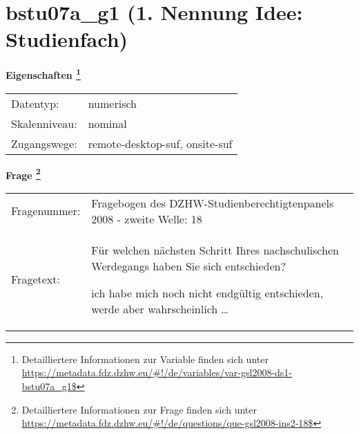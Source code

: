 
    \setcounter{footnote}{0}

    \vspace*{-1.8cm}
	\section{bstu07a\_g1 (1. Nennung Idee: Studienfach)}
	\label{section:bstu07a_g1}



    \vspace*{0.5cm}
    \noindent\textbf{Eigenschaften
	\footnote{Detailliertere Informationen zur Variable finden sich unter
		\url{https://metadata.fdz.dzhw.eu/\#!/de/variables/var-gsl2008-ds1-bstu07a_g1$}}}\\
	\begin{tabularx}{\hsize}{@{}lX}
	Datentyp: & numerisch \\
	Skalenniveau: & nominal \\
	Zugangswege: &
	  remote-desktop-suf, 
	  onsite-suf
 \\
    \end{tabularx}



				\vspace*{0.5cm}
                \noindent\textbf{Frage
	                \footnote{Detailliertere Informationen zur Frage finden sich unter
		              \url{https://metadata.fdz.dzhw.eu/\#!/de/questions/que-gsl2008-ins2-18$}}}\\
				\begin{tabularx}{\hsize}{@{}lX}
					Fragenummer: &
					  Fragebogen des DZHW-Studienberechtigtenpanels 2008 - zweite Welle:
					  18
 \\
					Fragetext: & Für welchen nächsten Schritt Ihres nachschulischen Werdegangs haben Sie sich entschieden?\par  ich habe mich noch nicht endgültig entschieden, werde aber wahrscheinlich … \\
				\end{tabularx}





